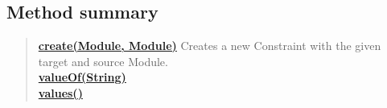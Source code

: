 \documentclass[11pt,a4paper]{report}
\begin{document}
{{{{{{{{{{{{{			\subsection{Method summary}{
				\begin{verse}
					\hyperlink{studyplanning.model.workflow.constraint.ConstraintType.create(studyplanning.model.workflow.Module, studyplanning.model.workflow.Module)}{{\bf create(Module, Module)}} Creates a new Constraint with the given target and source Module.\\
					\hyperlink{studyplanning.model.workflow.constraint.ConstraintType.valueOf(java.lang.String)}{{\bf valueOf(String)}} \\
					\hyperlink{studyplanning.model.workflow.constraint.ConstraintType.values()}{{\bf values()}} \\
				\end{verse}
			}

}}}}}}}}}}}}}
\end{document}
